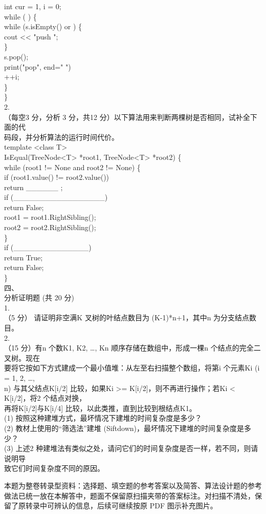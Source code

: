 \begin{question}
int cur = 1,  i = 0;\\
while  (           ) \{\\
while (s.isEmpty()  or            ) \{\\
cout << "push ";\\
\}\\
s.pop();\\
print("pop", end=" ")\\
++i;\\
\}\\
\}\\
2.\\
（每空3 分，分析 3 分，共12 分）以下算法用来判断两棵树是否相同，试补全下面的代\\
码段，并分析算法的运行时间代价。\\
template <class T>\\
IsEqual(TreeNode<T>  *root1,  TreeNode<T>  *root2) \{\\
while (root1 != None  and root2 != None) \{\\
if (root1.value()  !=  root2.value())\\
return   \_\_\_\_\_\_ ;\\
if  (\_\_\_\_\_\_\_\_\_\_\_\_\_\_\_\_\_)\\
return False;\\
root1 = root1.RightSibling();\\
root2 = root2.RightSibling();\\
\}\\
if (\_\_\_\_\_\_\_\_\_\_\_\_\_\_)\\
return True;\\
return False;\\
\}\\
四、\\
分析证明题 (共 20 分)\\
1.\\
（5 分） 请证明非空满K 叉树的叶结点数目为 (K-1)*n+1，其中n 为分支结点数目。\\
2.\\
（15 分）有n 个数K1, K2, …, Kn 顺序存储在数组中，形成一棵n 个结点的完全二叉树。现在\\
要将它按如下方式建成一个最小值堆：从左至右扫描整个数组，将第i 个元素Ki (i = 1, 2, …,\\
n) 与其父结点K[i/2] 比较，如果Ki >= K[i/2]，则不再进行操作；若Ki < K[i/2]，将2 个结点对换，\\
再将K[i/2]与K[i/4] 比较，以此类推，直到比较到根结点K1。\\
(1) 按照这种建堆方式，最坏情况下建堆的时间复杂度是多少？\\
(2) 教材上使用的“筛选法”建堆 (Siftdown)，最坏情况下建堆的时间复杂度是多少？\\
(3) 上述2 种建堆法有类似之处，请问它们的时间复杂度是否一样，若不同，则请说明导\\
致它们时间复杂度不同的原因。\\
\begin{solution}
本题为整卷转录型资料：选择题、填空题的参考答案以及简答、算法设计题的参考做法已统一放在本解答中，题面不保留原扫描夹带的答案标注。对扫描不清处，保留了原转录中可辨认的信息，后续可继续按原 PDF 图示补充图片。


\end{solution}
\end{question}
